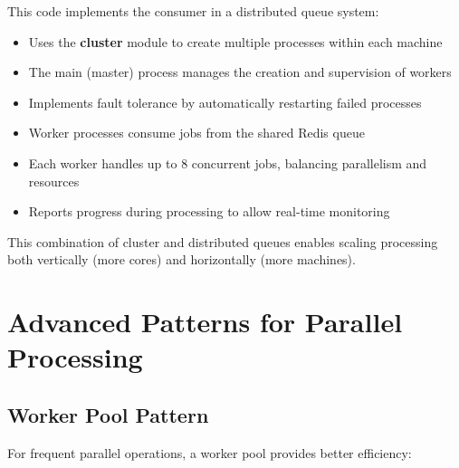 \documentclass[12pt,letterpaper]{article}
\begin{document}
This code implements the consumer in a distributed queue system:
\begin{itemize}
    \item Uses the \textbf{\textcolor{accentColor}{cluster}} module to create multiple processes within each machine
    \item The main (master) process manages the creation and supervision of workers
    \item Implements fault tolerance by automatically restarting failed processes
    \item Worker processes consume jobs from the shared Redis queue
    \item Each worker handles up to 8 concurrent jobs, balancing parallelism and resources
    \item Reports progress during processing to allow real-time monitoring
\end{itemize}

This combination of cluster and distributed queues enables scaling processing both vertically (more cores) and horizontally (more machines).

\section{Advanced Patterns for Parallel Processing}

\subsection{Worker Pool Pattern}

For frequent parallel operations, a worker pool provides better efficiency:
\end{document}
